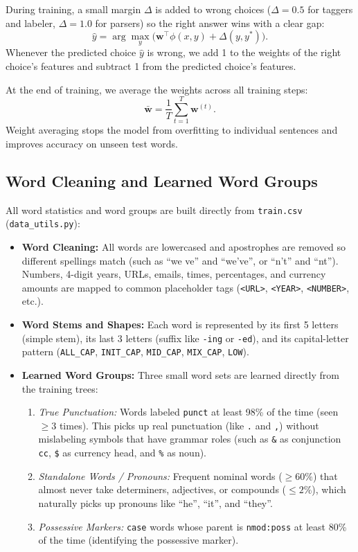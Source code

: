\documentclass[11pt,a4paper]{article}
\begin{document}
During training, a small margin $\Delta$ is added to wrong choices ($\Delta = 0.5$ for taggers and labeler, $\Delta = 1.0$ for parsers) so the right answer wins with a clear gap:
\begin{equation}
\hat{y} = \arg\max_{y} \big(\mathbf{w}^\top \phi(x, y) + \Delta(y, y^*)\big).
\end{equation}
Whenever the predicted choice $\hat{y}$ is wrong, we add 1 to the weights of the right choice's features and subtract 1 from the predicted choice's features.

At the end of training, we average the weights across all training steps:
\begin{equation}
\bar{\mathbf{w}} = \frac{1}{T} \sum_{t=1}^{T} \mathbf{w}^{(t)}.
\end{equation}
Weight averaging stops the model from overfitting to individual sentences and improves accuracy on unseen test words.

\subsection{Word Cleaning and Learned Word Groups}
All word statistics and word groups are built directly from \texttt{train.csv} (\texttt{data\_utils.py}):
\begin{itemize}[noitemsep]
    \item \textbf{Word Cleaning:} All words are lowercased and apostrophes are removed so different spellings match (such as ``we ve'' and ``we've'', or ``n't'' and ``nt''). Numbers, 4-digit years, URLs, emails, times, percentages, and currency amounts are mapped to common placeholder tags (\texttt{<URL>}, \texttt{<YEAR>}, \texttt{<NUMBER>}, etc.).
    \item \textbf{Word Stems and Shapes:} Each word is represented by its first 5 letters (simple stem), its last 3 letters (suffix like \texttt{-ing} or \texttt{-ed}), and its capital-letter pattern (\texttt{ALL\_CAP}, \texttt{INIT\_CAP}, \texttt{MID\_CAP}, \texttt{MIX\_CAP}, \texttt{LOW}).
    \item \textbf{Learned Word Groups:} Three small word sets are learned directly from the training trees:
    \begin{enumerate}[noitemsep]
        \item \emph{True Punctuation:} Words labeled \texttt{punct} at least 98\% of the time (seen $\ge 3$ times). This picks up real punctuation (like \texttt{.} and \texttt{,}) without mislabeling symbols that have grammar roles (such as \texttt{\&} as conjunction \texttt{cc}, \texttt{\$} as currency head, and \texttt{\%} as noun).
        \item \emph{Standalone Words / Pronouns:} Frequent nominal words ($\ge 60\%$) that almost never take determiners, adjectives, or compounds ($\le 2\%$), which naturally picks up pronouns like ``he'', ``it'', and ``they''.
        \item \emph{Possessive Markers:} \texttt{case} words whose parent is \texttt{nmod:poss} at least 80\% of the time (identifying the possessive marker).
    \end{enumerate}
\end{itemize}
\end{document}
